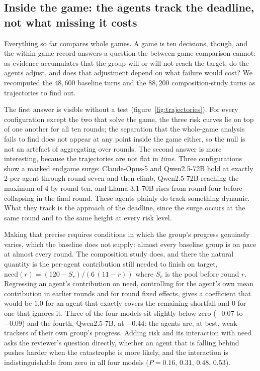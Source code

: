 \documentclass[openacc]{rsproca_new}
\begin{document}
\subsection{Inside the game: the agents track the deadline, not what missing it costs}
\label{sec:trajectories}
Everything so far compares whole games. A game is ten decisions, though, and the within-game record answers a question the between-game comparison cannot: as evidence accumulates that the group will or will not reach the target, do the agents adjust, and does that adjustment depend on what failure would cost? We recomputed the $48{,}600$ baseline turns and the $88{,}200$ composition-study turns as trajectories to find out.

The first answer is visible without a test (figure~\ref{fig:trajectories}). For every configuration except the two that solve the game, the three risk curves lie on top of one another for all ten rounds; the separation that the whole-game analysis fails to find does not appear at any point inside the game either, so the null is not an artefact of aggregating over rounds. The second answer is more interesting, because the trajectories are not flat in \emph{time}. Three configurations show a marked endgame surge: Claude-Opus-5 and Qwen2.5-72B hold at exactly $2$ per agent through round seven and then climb, Qwen2.5-72B reaching the maximum of $4$ by round ten, and Llama-3.1-70B rises from round four before collapsing in the final round. These agents plainly do track something dynamic. What they track is the approach of the deadline, since the surge occurs at the same round and to the same height at every risk level.

Making that precise requires conditions in which the group's progress genuinely varies, which the baseline does not supply: almost every baseline group is on pace at almost every round. The composition study does, and there the natural quantity is the per-agent contribution still needed to finish on target, $\mathrm{need}(r)=(120-S_r)/(6\,(11-r))$ where $S_r$ is the pool before round $r$. Regressing an agent's contribution on $\mathrm{need}$, controlling for the agent's own mean contribution in earlier rounds and for round fixed effects, gives a coefficient that would be $1.0$ for an agent that exactly covers the remaining shortfall and $0$ for one that ignores it. Three of the four models sit slightly below zero ($-0.07$ to $-0.09$) and the fourth, Qwen2.5-7B, at $+0.44$: the agents are, at best, weak trackers of their own group's progress. Adding risk and its interaction with $\mathrm{need}$ asks the reviewer's question directly, whether an agent that is falling behind pushes harder when the catastrophe is more likely, and the interaction is indistinguishable from zero in all four models ($P=0.16$, $0.31$, $0.48$, $0.53$).
\end{document}
